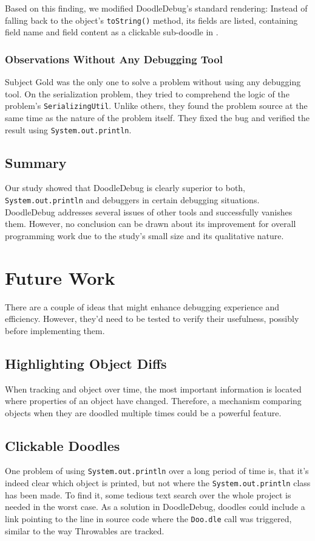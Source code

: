 \documentclass[english]{scrartcl}
\newcommand{\DD}{Dood\-le\-De\-bug\xspace}
\newcommand{\Doodle}{\texttt{Doo.\-dle}\xspace}
\newcommand{\println}{\texttt{Sys\-tem.\-out.\-println}\xspace}
\begin{document}
Based on this finding, we modified DoodleDebug's standard rendering: Instead of falling back to the object's \texttt{toString()} method, its fields are listed, containing field name and field content as a clickable sub-doodle in .

\subsubsection{Observations Without Any Debugging Tool}
Subject Gold was the only one to solve a problem without using any debugging tool.
On the serialization problem, they tried to comprehend the logic of the problem's \texttt{SerializingUtil}.
Unlike others, they found the problem source at the same time as the nature of the problem itself.
They fixed the bug and verified the result using \println.

\subsection{Summary}
Our study showed that \DD is clearly superior to both, \println and debuggers in certain debugging situations.
\DD addresses several issues of other tools and successfully vanishes them.
However, no conclusion can be drawn about its improvement for overall programming work due to the study's small size and its qualitative nature.

\section{Future Work}
There are a couple of ideas that might enhance debugging experience and efficiency.
However, they'd need to be tested to verify their usefulness, possibly before implementing them.

\subsection{Highlighting Object Diffs}
When tracking and object over time, the most important information is located where properties of an object have changed.
Therefore, a mechanism comparing objects when they are doodled multiple times could be a powerful feature.

\subsection{Clickable Doodles}
One problem of using \println over a long period of time is, that it's indeed clear which object is printed, but not where the \println class has been made.
To find it, some tedious text search over the whole project is needed in the worst case.
As a solution in \DD, doodles could include a link pointing to the line in source code where the \Doodle call was triggered, similar to the way Throwables are tracked.
\end{document}

